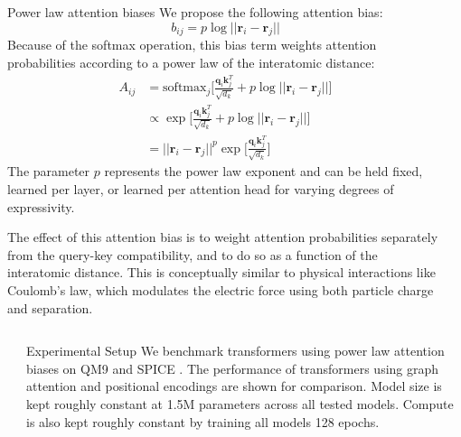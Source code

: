 \documentclass{beamer}
\newlength{\sepwidth}
\newlength{\colwidth}
\newcommand{\separatorcolumn}{\begin{column}{\sepwidth}\end{column}}
\begin{document}
\begin{frame}[t]
\begin{block}{}
\begin{columns}[t]
\begin{column}{\colwidth}
    \begin{block}{Power law attention biases}
        We propose the following attention bias:
        \begin{equation}\label{power-law-bias}
            b_{ij} = p \log || \mathbf{r}_i - \mathbf{r}_j ||
        \end{equation}
        Because of the softmax operation, this bias term weights attention probabilities according to a power law of the interatomic distance: 
        \begin{equation}
        \begin{split}
            A_{ij} &= \text{softmax}_j \biggr [\frac{\mathbf{q}_{i} \mathbf{k}_j^T}{\sqrt{d_k}} + p \log || \mathbf{r}_i - \mathbf{r}_j || \biggr] \\
            &\propto \exp \biggr[ \frac{\mathbf{q}_{i} \mathbf{k}_j^T}{\sqrt{d_k}} + p \log || \mathbf{r}_i - \mathbf{r}_j || \biggr] \\
            &= || \mathbf{r}_i - \mathbf{r}_j ||^{p}\exp \biggr[ \frac{\mathbf{q}_{i} \mathbf{k}_j^T}{\sqrt{d_k}} \biggr]
        \end{split}
        \end{equation}
        The parameter $p$ represents the power law exponent and can be held fixed, learned per layer, or learned per attention head for varying degrees of expressivity. 
        
        The effect of this attention bias is to weight attention probabilities separately from the query-key compatibility, and to do so as a function of the interatomic distance. This is conceptually similar to physical interactions like Coulomb's law, which modulates the electric force using both particle charge and separation. 
    \end{block}

\end{column}

\separatorcolumn

\end{columns}
\end{block}

\hline
\vspace{-1em}
\begin{block}{}
\begin{columns}[t]

\separatorcolumn

\begin{column}{\colwidth}

    \begin{block}{Experimental Setup}
        We benchmark transformers using power law attention biases on QM9 \cite{qm9} and SPICE \cite{spice}. The performance of transformers using graph attention and positional encodings are shown for comparison. Model size is kept roughly constant at 1.5M parameters across all tested models. Compute is also kept roughly constant by training all models 128 epochs. 
    \end{block}


\end{column}
\end{columns}
\end{block}
\end{frame}
\end{document}
